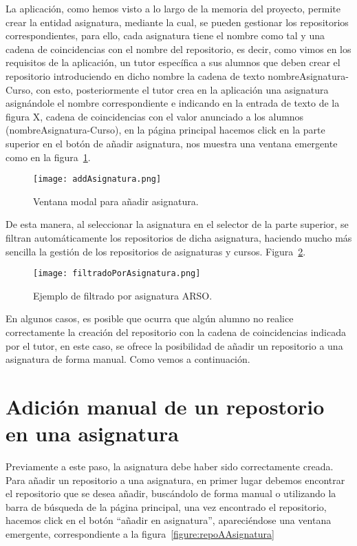     La aplicación, como hemos visto a lo largo de la memoria del proyecto, permite crear la entidad asignatura, mediante la cual, se pueden gestionar los repositorios correspondientes, para ello, cada asignatura tiene el nombre como tal y una cadena de coincidencias con el nombre del repositorio, es decir, como vimos en los requisitos de la aplicación, un tutor específica a sus alumnos que deben crear el repositorio introduciendo en dicho nombre la cadena de texto nombreAsignatura-Curso, con esto, posteriormente el tutor crea en la aplicación una asignatura asignándole el nombre correspondiente e indicando en la entrada de texto de la figura X, cadena de coincidencias con el valor anunciado a los alumnos (nombreAsignatura-Curso), en la página principal hacemos click en la parte superior en el botón de añadir asignatura, nos muestra una ventana emergente como en la figura~\ref{figure:addAsignatura}.

    \begin{figure}[h!]
      \texttt{[image: addAsignatura.png]}
      \caption{Ventana modal para añadir asignatura.}
      \label{figure:addAsignatura}
    \end{figure}

    De esta manera, al seleccionar la asignatura en el selector de la parte superior, se filtran automáticamente los repositorios de dicha asignatura, haciendo mucho más sencilla la gestión de los repositorios de asignaturas y cursos. Figura~\ref{figure:filtradoAsignatura}.

    \begin{figure}[h!]
      \texttt{[image: filtradoPorAsignatura.png]}
      \caption{Ejemplo de filtrado por asignatura ARSO.}
      \label{figure:filtradoAsignatura}
    \end{figure}
    En algunos casos, es posible que ocurra que algún alumno no realice correctamente la creación del repositorio con la cadena de coincidencias indicada por el tutor, en este caso, se ofrece la posibilidad de añadir un repositorio a una asignatura de forma manual. Como vemos a continuación.




\section{Adición manual de un repostorio en una asignatura}


    Previamente a este paso, la asignatura debe haber sido correctamente creada.
    Para añadir un repositorio a una asignatura, en primer lugar debemos encontrar el repositorio que se desea añadir, buscándolo de forma manual o utilizando la barra de búsqueda de la página principal, una vez encontrado el repositorio, hacemos click en el botón “añadir en asignatura”, apareciéndose una ventana emergente, correspondiente a la figura~\ref{figure:repoAAsignatura}

